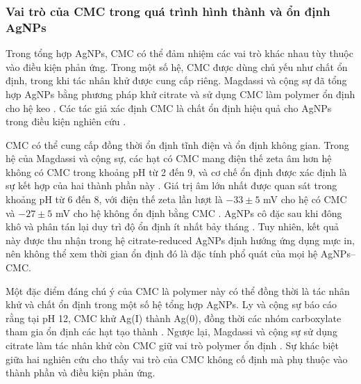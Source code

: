\subsubsection{Vai trò của CMC trong quá trình hình thành và ổn định AgNPs}
Trong tổng hợp AgNPs, CMC có thể đảm nhiệm các vai trò khác nhau tùy thuộc vào điều kiện phản ứng.
Trong một số hệ, CMC được dùng chủ yếu như chất ổn định, trong khi tác nhân khử được cung cấp riêng.
Magdassi và cộng sự đã tổng hợp AgNPs bằng phương pháp khử citrate và sử dụng CMC làm polymer ổn định cho hệ keo \parencite{magdassi2003}.
Các tác giả xác định CMC là chất ổn định hiệu quả cho AgNPs trong điều kiện nghiên cứu \parencite{magdassi2003}.
\par
CMC có thể cung cấp đồng thời ổn định tĩnh điện và ổn định không gian.
Trong hệ của Magdassi và cộng sự, các hạt có CMC mang điện thế zeta âm hơn hệ không có CMC trong khoảng pH từ 2 đến 9, và cơ chế ổn định được xác định là sự kết hợp của hai thành phần này \parencite{magdassi2003}.
Giá trị âm lớn nhất được quan sát trong khoảng pH từ 6 đến 8, với điện thế zeta lần lượt là $-33 \pm 5$ mV cho hệ có CMC và $-27 \pm 5$ mV cho hệ không ổn định bằng CMC \parencite{magdassi2003}.
AgNPs cô đặc sau khi đông khô và phân tán lại duy trì độ ổn định ít nhất bảy tháng \parencite{magdassi2003}.
Tuy nhiên, kết quả này được thu nhận trong hệ citrate-reduced AgNPs định hướng ứng dụng mực in, nên không thể xem thời gian ổn định đó là đặc tính phổ quát của mọi hệ AgNPs--CMC.
\par
Một đặc điểm đáng chú ý của CMC là polymer này có thể đồng thời là tác nhân khử và chất ổn định trong một số hệ tổng hợp AgNPs.
Ly và cộng sự báo cáo rằng tại pH 12, CMC khử Ag(I) thành Ag(0), đồng thời các nhóm carboxylate tham gia ổn định các hạt tạo thành \parencite{ly2024}.
Ngược lại, Magdassi và cộng sự sử dụng citrate làm tác nhân khử còn CMC giữ vai trò polymer ổn định \parencite{magdassi2003}.
Sự khác biệt giữa hai nghiên cứu cho thấy vai trò của CMC không cố định mà phụ thuộc vào thành phần và điều kiện phản ứng.
